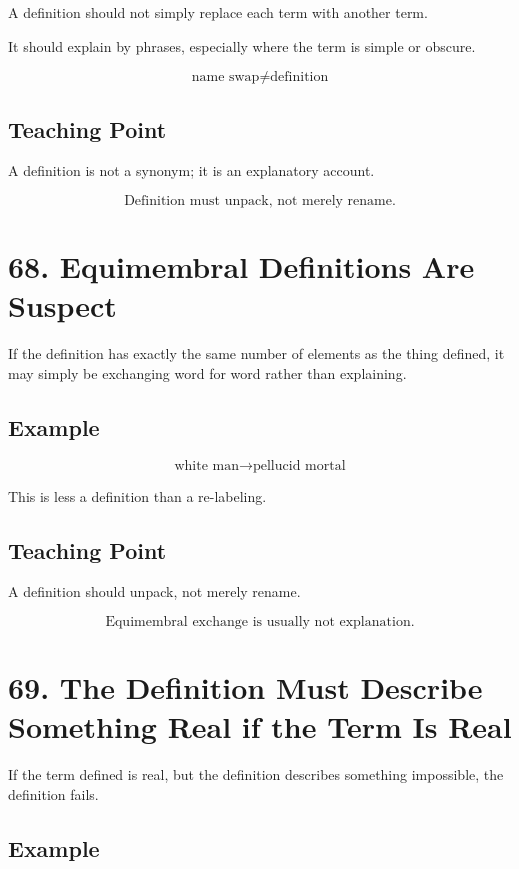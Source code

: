 \documentclass[12pt]{article}
\begin{document}
A definition should not simply replace each term with another term.

It should explain by phrases, especially where the term is simple or obscure.

\[
\text{name swap} \neq \text{definition}
\]

\subsection*{Teaching Point}

A definition is not a synonym; it is an explanatory account.

\[
\boxed{
\text{Definition must unpack, not merely rename.}
}
\]

\section*{68. Equimembral Definitions Are Suspect}

If the definition has exactly the same number of elements as the thing defined,
it may simply be exchanging word for word rather than explaining.

\subsection*{Example}

\[
\text{white man} \rightarrow \text{pellucid mortal}
\]

This is less a definition than a re-labeling.

\subsection*{Teaching Point}

A definition should unpack, not merely rename.

\[
\boxed{
\text{Equimembral exchange is usually not explanation.}
}
\]

\section*{69. The Definition Must Describe Something Real if the Term Is Real}

If the term defined is real, but the definition describes something impossible,
the definition fails.

\subsection*{Example}
\end{document}
